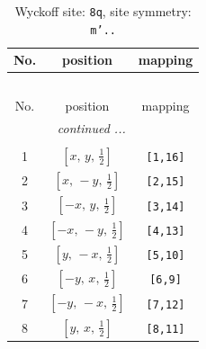 \documentclass[fleqn,8pt]{jsarticle}
\begin{document}
\begin{longtable}{ccc}
\caption{Wyckoff site: {\tt 8q}, site symmetry: {\tt m'..}}
 \\
 \hline \hline
No. & position & mapping \\ \hline \endfirsthead

\multicolumn{2}{l}{\tablename\ \thetable{}} \\
 \hline \hline
No. & position & mapping \\ \hline \endhead

 \hline \hline
\multicolumn{2}{r}{\footnotesize\it continued ...} \\ \endfoot

 \hline \hline
\multicolumn{2}{r}{} \\ \endlastfoot

1 & $\left[ x,\, y,\, \frac{1}{2} \right]$ & {\tt [1,16]} \\ \hline
2 & $\left[ x,\, - y,\, \frac{1}{2} \right]$ & {\tt [2,15]} \\ \hline
3 & $\left[ - x,\, y,\, \frac{1}{2} \right]$ & {\tt [3,14]} \\ \hline
4 & $\left[ - x,\, - y,\, \frac{1}{2} \right]$ & {\tt [4,13]} \\ \hline
5 & $\left[ y,\, - x,\, \frac{1}{2} \right]$ & {\tt [5,10]} \\ \hline
6 & $\left[ - y,\, x,\, \frac{1}{2} \right]$ & {\tt [6,9]} \\ \hline
7 & $\left[ - y,\, - x,\, \frac{1}{2} \right]$ & {\tt [7,12]} \\ \hline
8 & $\left[ y,\, x,\, \frac{1}{2} \right]$ & {\tt [8,11]} \\
\end{longtable}
\renewcommand{\arraystretch}{1.2}
\end{document}
